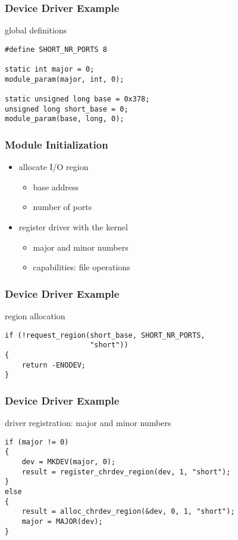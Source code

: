 \documentclass[dvipsnames]{beamer}
\begin{document}
\begin{frame}[fragile]
  \frametitle{Device Driver Example}

  \begin{exampleblock}{global definitions}
    \begin{lstlisting}
#define SHORT_NR_PORTS 8

static int major = 0;
module_param(major, int, 0);

static unsigned long base = 0x378;
unsigned long short_base = 0;
module_param(base, long, 0);
    \end{lstlisting}
  \end{exampleblock}
\end{frame}

\begin{frame}
  \frametitle{Module Initialization}

  \begin{itemize}
    \item allocate I/O region
    \begin{itemize}
      \item base address
      \item number of ports
    \end{itemize}

    \pause
    \medskip
    \item register driver with the kernel
    \begin{itemize}
      \item major and minor numbers
      \item capabilities: file operations
    \end{itemize}
  \end{itemize}
\end{frame}

\begin{frame}[fragile]
  \frametitle{Device Driver Example}

  \begin{exampleblock}{region allocation}
    \begin{lstlisting}
if (!request_region(short_base, SHORT_NR_PORTS,
                    "short"))
{
    return -ENODEV;
}
    \end{lstlisting}
  \end{exampleblock}
\end{frame}

\begin{frame}[fragile]
  \frametitle{Device Driver Example}

  \begin{exampleblock}{driver registration: major and minor numbers}
    \begin{lstlisting}
if (major != 0)
{
    dev = MKDEV(major, 0);
    result = register_chrdev_region(dev, 1, "short");
}
else
{
    result = alloc_chrdev_region(&dev, 0, 1, "short");
    major = MAJOR(dev);
}
    \end{lstlisting}
  \end{exampleblock}
\end{frame}
\end{document}
